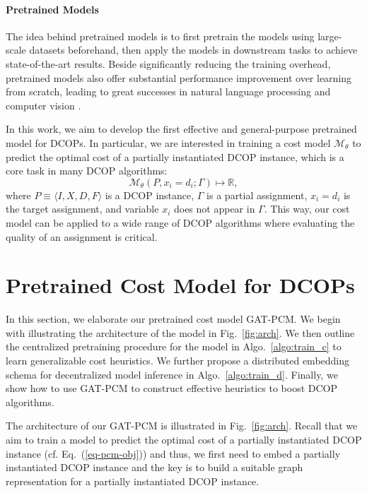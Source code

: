 \documentclass[letterpaper]{article} %
\begin{document}
\paragraph{Pretrained Models} The idea behind pretrained models is to first pretrain the models using large-scale datasets beforehand, then apply the models in downstream tasks to achieve state-of-the-art results. Beside significantly reducing the training overhead, pretrained models also offer substantial performance improvement over learning from scratch, leading to great successes in natural language processing \cite{brown2020language,devlin2018bert} and computer vision \cite{he2016deep,krizhevsky2017imagenet,simonyan2014very}.

In this work, we aim to develop the first effective and general-purpose pretrained model for DCOPs. In particular, we are interested in training a cost model $\mathcal{M}_\theta$ to predict the optimal cost of a partially instantiated DCOP instance, which is a core task in many DCOP algorithms:
\begin{equation}
\mathcal{M}_\theta(P,x_i=d_i;\Gamma)\mapsto \mathbb{R}, \label{eq-pcm-obj}  
\end{equation}
where $P\equiv\langle I,X,D,F\rangle$ is a DCOP instance, $\Gamma$ is a partial assignment, $x_i=d_i$ is the target assignment, and variable $x_i$ does not appear in $\Gamma$. This way, our cost model can be applied to a wide range of DCOP algorithms where evaluating the quality of an assignment is critical.

\section{Pretrained Cost Model for DCOPs}
In this section, we elaborate our pretrained cost model GAT-PCM. We begin with illustrating the architecture of the model in Fig.~\ref{fig:arch}. We then outline the centralized pretraining procedure for the model in Algo.~\ref{algo:train_c} to learn generalizable cost heuristics. We further propose a distributed embedding schema for decentralized model inference in Algo.~\ref{algo:train_d}.
Finally, we show how to use GAT-PCM to construct effective heuristics to boost DCOP algorithms.

The architecture of our GAT-PCM is illustrated in Fig.~\ref{fig:arch}. 
Recall that we aim to train a model to predict the optimal cost of a partially instantiated DCOP instance (cf. Eq.~(\ref{eq-pcm-obj})) and thus, we first need to embed a partially instantiated DCOP instance and the key is to build a suitable graph representation for a partially instantiated DCOP instance.
\end{document}
